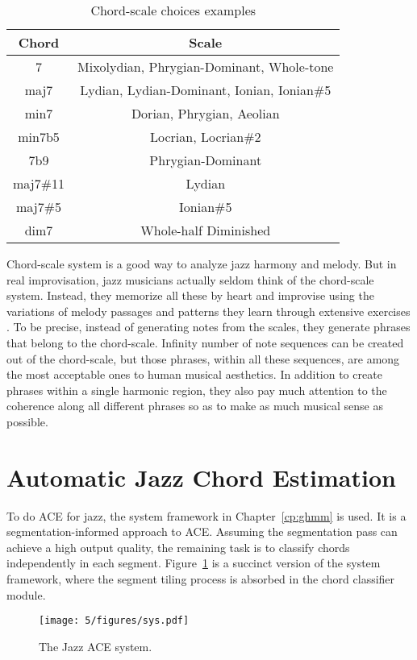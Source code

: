 \begin{table}
\centering
\footnotesize
\begin{tabular}{|c|c|} \hline
Chord & Scale \\ \hline
7 & Mixolydian, Phrygian-Dominant, Whole-tone \\ \hline
maj7 & Lydian, Lydian-Dominant, Ionian, Ionian\#5 \\ \hline
min7 & Dorian, Phrygian, Aeolian \\ \hline
min7b5 & Locrian, Locrian\#2 \\ \hline
7b9 & Phrygian-Dominant \\ \hline
maj7\#11 & Lydian \\ \hline
maj7\#5 & Ionian\#5 \\ \hline
dim7 & Whole-half Diminished \\ \hline
\end{tabular}
\caption{Chord-scale choices examples}
\label{tab:5-chordscale}
\end{table}

Chord-scale system is a good way to analyze jazz harmony and melody. But in real improvisation, jazz musicians actually seldom think of the chord-scale system. Instead, they memorize all these by heart and improvise using the variations of melody passages and patterns they learn through extensive exercises \cite{jazzguitarimpro}. To be precise, instead of generating notes from the scales, they generate phrases that belong to the chord-scale. Infinity number of note sequences can be created  out of the chord-scale, but those phrases, within all these sequences, are among the most acceptable ones to human musical aesthetics. In addition to create phrases within a single harmonic region, they also pay much attention to the coherence along all different phrases so as to make as much musical sense as possible.

\section{Automatic Jazz Chord Estimation} \label{sec:5-jazzace}
To do ACE for jazz, the system framework in Chapter~\ref{cp:ghmm} is used. It is a segmentation-informed approach to ACE. Assuming the segmentation pass can achieve a high output quality, the remaining task is to classify chords independently in each segment. Figure~\ref{fig:5-jazzsys} is a succinct version of the system framework, where the segment tiling process is absorbed in the chord classifier module.
\begin{figure}[htb]
    \centering
        \texttt{[image: 5/figures/sys.pdf]}
    \caption{The Jazz ACE system.}
    \label{fig:5-jazzsys}
\end{figure}

